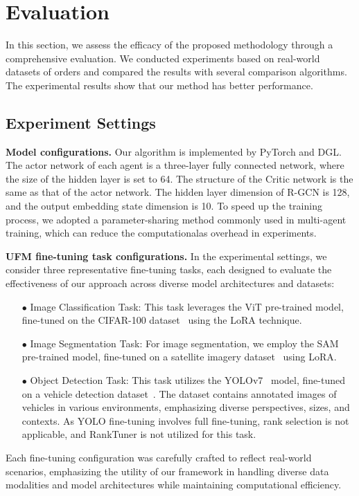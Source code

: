 \section{Evaluation}
In this section, we assess the efficacy of the proposed methodology through a comprehensive evaluation. We conducted experiments based on real-world datasets of orders and compared the results with several comparison algorithms. The experimental results show that our method has better performance.

\subsection{Experiment Settings}

\noindent\textbf{Model configurations.} Our algorithm is implemented by PyTorch and DGL. The actor network of each agent is a three-layer fully connected network, where the size of the hidden layer is set to 64. The structure of the Critic network is the same as that of the actor network. The hidden layer dimension of R-GCN is 128, and the output embedding state dimension is 10. To speed up the training process, we adopted a parameter-sharing method commonly used in multi-agent training, which can reduce the computationalas overhead in experiments.

\noindent\textbf{UFM fine-tuning task configurations.} 
In the experimental settings, we consider three representative fine-tuning tasks, each designed to evaluate the effectiveness of our approach across diverse model architectures and datasets:  
\begin{itemize}
\item[$\bullet$] Image Classification Task: This task leverages the ViT pre-trained model, fine-tuned on the CIFAR-100 dataset~\cite{krizhevsky2009learning} using the LoRA technique.
\end{itemize}
\begin{itemize}
\item[$\bullet$] Image Segmentation Task: For image segmentation, we employ the SAM pre-trained model, fine-tuned on a satellite imagery dataset~\cite{ji2018fully} using LoRA.
\end{itemize}
\begin{itemize}
\item[$\bullet$] Object Detection Task: This task utilizes the YOLOv7~\cite{wang2023yolov7} model, fine-tuned on a vehicle detection dataset~\cite{vehicle-detection-nmzlp_dataset}. The dataset contains annotated images of vehicles in various environments, emphasizing diverse perspectives, sizes, and contexts. As YOLO fine-tuning involves full fine-tuning, rank selection is not applicable, and RankTuner is not utilized for this task.
\end{itemize}
Each fine-tuning configuration was carefully crafted to reflect real-world scenarios, emphasizing the utility of our framework in handling diverse data modalities and model architectures while maintaining computational efficiency.


